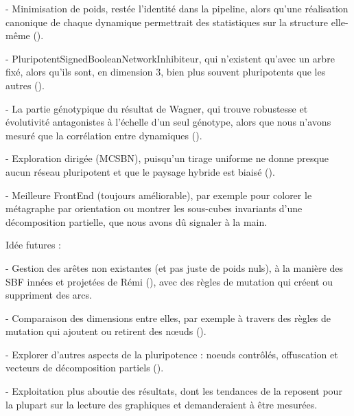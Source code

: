\documentclass[12pt, a4paper]{article}
\begin{document}
- Minimisation de poids, restée l'identité dans la pipeline, alors qu'une réalisation canonique de chaque dynamique permettrait des statistiques sur la structure elle-même ().

- PluripotentSignedBooleanNetworkInhibiteur, qui n'existent qu'avec un arbre fixé, alors qu'ils sont, en dimension 3, bien plus souvent pluripotents que les autres ().

- La partie génotypique du résultat de Wagner, qui trouve robustesse et évolutivité antagonistes à l'échelle d'un seul génotype, alors que nous n'avons mesuré que la corrélation entre dynamiques ().

- Exploration dirigée (MCSBN), puisqu'un tirage uniforme ne donne presque aucun réseau pluripotent et que le paysage hybride est biaisé ().

- Meilleure FrontEnd (toujours améliorable), par exemple pour colorer le métagraphe par orientation ou montrer les sous-cubes invariants d'une décomposition partielle, que nous avons dû signaler à la main.

\vspace{5pt}
Idée futures : 

- Gestion des arêtes non existantes (et pas juste de poids nuls), à la manière des SBF innées et projetées de Rémi (), avec des règles de mutation qui créent ou suppriment des arcs.

- Comparaison des dimensions entre elles, par exemple à travers des règles de mutation qui ajoutent ou retirent des nœuds ().

- Explorer d'autres aspects de la pluripotence : noeuds contrôlés, offuscation et vecteurs de décomposition partiels ().

- Exploitation plus aboutie des résultats, dont les tendances de la  reposent pour la plupart sur la lecture des graphiques et demanderaient à être mesurées.



\newpage
\nocite{*}
\printbibliography[title={Références}]

\newpage
\appendix





\end{document}
